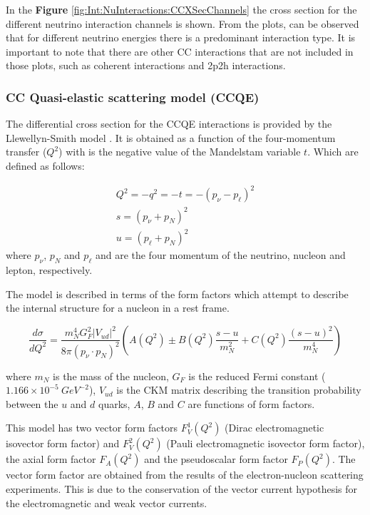 In the \textbf{Figure} \ref{fig:Int:NuInteractions:CCXSecChannels} the cross section for the different neutrino interaction channels is shown. From the plots, can be observed that for different neutrino energies there is a predominant interaction type. It is important to note that there are other CC interactions that are not included in those plots, such as coherent interactions and 2p2h interactions.  

\subsubsection{CC Quasi-elastic scattering model (CCQE)}
\label{Cap:Int:NuInteractions:CCQEmodel}
The differential cross section for the CCQE interactions is provided by the Llewellyn-Smith model \cite{LLEWELLYNSMITH1972261}. It is obtained as a function of the four-momentum transfer ($Q^2$) with is the negative value of the Mandelstam variable $t$. Which are defined as follows: 

\begin{equation}
    \begin{split}
        Q^2 = -q^2 = -t = -(p_\nu - p_\ell)^2\\
        s = (p_\nu + p_N)^2 \\
        u = (p_\ell + p_N)^2
    \end{split}
\end{equation}
where $p_\nu$, $p_N$ and $p_\ell$ and are the four momentum of the neutrino, nucleon and lepton, respectively.

The model is described in terms of the form factors which attempt to describe the internal structure for a nucleon in a rest frame. 

\begin{equation}
    \frac{d\sigma}{dQ^2} = \frac{m^4_N G^2_F|V_{ud}|^2}{8\pi(p_\nu \cdot p_N)^2}\left(A(Q^2)\pm B(Q^2)\frac{s-u}{m^2_N}+C(Q^2)\frac{(s-u)^2}{m^4_N}\right)
\end{equation}

where $m_N$ is the mass of the nucleon, $G_F$ is the reduced Fermi constant ($1.166 \times 10^{−5}\ GeV^{−2}$), $V_{ud}$ is the CKM matrix describing the transition probability between the $u$ and $d$ quarks, $A$, $B$ and $C$ are functions of form factors. 

This model has two vector form factors $F^1_V (Q^2)$ (Dirac electromagnetic isovector form factor) and $F^2_V (Q^2)$ (Pauli electromagnetic isovector form factor), the axial form factor $F_A(Q^2)$ and the pseudoscalar form factor $F_P(Q^2)$. The vector form factor are obtained from the results of the electron-nucleon scattering experiments. This is due to the conservation of the vector current hypothesis for the electromagnetic and weak vector currents. 

